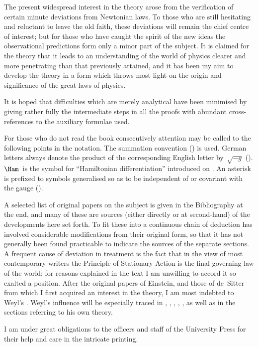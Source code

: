 \documentclass[12pt]{book}
\begin{document}
The present widespread interest in the theory arose from the verification
of certain minute deviations from Newtonian laws. To those who are still
hesitating and reluctant to leave the old faith, these deviations will remain
the chief centre of interest; but for those who have caught the spirit of the
new ideas the observational predictions form only a minor part of the subject.
It is claimed for the theory that it leads to an understanding of the world of
physics clearer and more penetrating than that previously attained, and it
has been my aim to develop the theory in a form which throws most light
on the origin and significance of the great laws of physics.

It is hoped that difficulties which are merely analytical have been minimised
by giving rather fully the intermediate steps in all the proofs with
abundant cross\hyp{}references to the auxiliary formulae used.

For those who do not read the book consecutively attention may be called
to the following points in the notation. The summation convention ()
is used. German letters always denote the product of the corresponding
English letter by~$\sqrt{-g}$ (). $\Ham$~is the symbol for ``Hamiltonian differentiation''
introduced on . An asterisk is prefixed to symbols generalised
so as to be independent of or covariant with the gauge ().

A selected list of original papers on the subject is given in the Bibliography
at the end, and many of these are sources (either directly or at
second\hyp{}hand) of the developments here set forth. To fit these into a continuous
chain of deduction has involved considerable modifications from their
original form, so that it has not generally been found practicable to indicate
the sources of the separate sections. A frequent cause of deviation in treatment
is the fact that in the view of most contemporary writers the Principle
of Stationary Action is the final governing law of the world; for reasons
explained in the text I am unwilling to accord it so exalted a position. After
the original papers of Einstein, and those of de~Sitter from which I first
acquired an interest in the theory, I am most indebted to Weyl's . Weyl's influence will be especially traced in , , , , , as
well as in the sections referring to his own theory.

I am under great obligations to the officers and staff of the University
Press for their help and care in the intricate printing.
\end{document}
